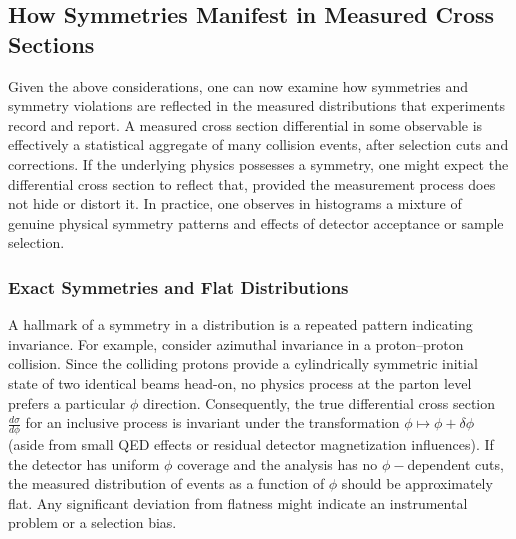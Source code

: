     \subsection{How Symmetries Manifest in Measured Cross Sections}
    \label{subsec:cross-section-symmetries}
        Given the above considerations, one can now examine how symmetries and symmetry violations are reflected in the measured distributions that experiments record and report.
        A measured cross section differential in some observable is effectively a statistical aggregate of many collision events, after selection cuts and corrections.
        If the underlying physics possesses a symmetry, one might expect the differential cross section to reflect that, provided the measurement process does not hide or distort it.
        In practice, one observes in histograms a mixture of genuine physical symmetry patterns and effects of detector acceptance or sample selection.

        \subsubsection{Exact Symmetries and Flat Distributions}
            A hallmark of a symmetry in a distribution is a repeated pattern indicating invariance.
            For example, consider azimuthal invariance in a proton--proton collision.
            Since the colliding protons provide a cylindrically symmetric initial state of two identical beams head-on, no physics process at the parton level prefers a particular $\phi$ direction.
            Consequently, the true differential cross section $\frac{d\sigma}{d\phi}$ for an inclusive process is invariant under the transformation $\phi\mapsto\phi+\delta\phi$ (aside from small QED effects or residual detector magnetization influences).
            If the detector has uniform $\phi$ coverage and the analysis has no $\phi-$dependent cuts, the measured distribution of events as a function of $\phi$ should be approximately flat.
            Any significant deviation from flatness might indicate an instrumental problem or a selection bias.
            
